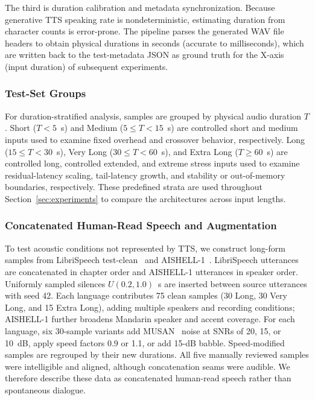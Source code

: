 \documentclass[conference]{IEEEtran}
\begin{document}
The third is duration calibration and metadata synchronization. Because generative TTS speaking rate is nondeterministic, estimating duration from character counts is error-prone. The pipeline parses the generated WAV file headers to obtain physical durations in seconds (accurate to milliseconds), which are written back to the test-metadata JSON as ground truth for the X-axis (input duration) of subsequent experiments.

\subsubsection{Test-Set Groups}

For duration-stratified analysis, samples are grouped by physical audio duration $T$. Short ($T<5$~s) and Medium ($5\leq T<15$~s) are controlled short and medium inputs used to examine fixed overhead and crossover behavior, respectively. Long ($15\leq T<30$~s), Very Long ($30\leq T<60$~s), and Extra Long ($T\geq60$~s) are controlled long, controlled extended, and extreme stress inputs used to examine residual-latency scaling, tail-latency growth, and stability or out-of-memory boundaries, respectively. These predefined strata are used throughout Section~\ref{sec:experiments} to compare the architectures across input lengths.

\subsubsection{Concatenated Human-Read Speech and Augmentation}

To test acoustic conditions not represented by TTS, we construct long-form samples from LibriSpeech test-clean~\cite{panayotov2015librispeech} and AISHELL-1~\cite{bu2017aishell1}. LibriSpeech utterances are concatenated in chapter order and AISHELL-1 utterances in speaker order. Uniformly sampled silences $U(0.2,1.0)$~s are inserted between source utterances with seed 42. Each language contributes 75 clean samples (30 Long, 30 Very Long, and 15 Extra Long), adding multiple speakers and recording conditions; AISHELL-1 further broadens Mandarin speaker and accent coverage. For each language, six 30-sample variants add MUSAN~\cite{snyder2015musan} noise at SNRs of 20, 15, or 10~dB, apply speed factors 0.9 or 1.1, or add 15-dB babble. Speed-modified samples are regrouped by their new durations. All five manually reviewed samples were intelligible and aligned, although concatenation seams were audible. We therefore describe these data as concatenated human-read speech rather than spontaneous dialogue.
\end{document}
